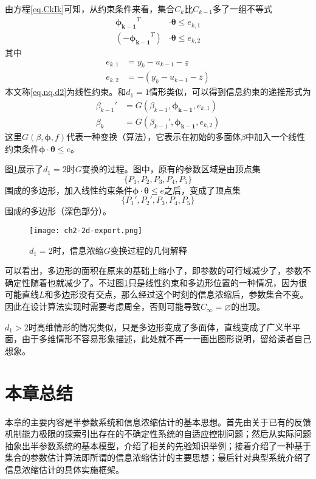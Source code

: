 由方程\eqref{eq.CkIk}可知，从约束条件来看，集合$C_{k}$比$C_{k-1}$多了一组不等式
\begin{equation}%
\label{eq.nq.d2}
\begin{split}%
\bm{\phi_{k-1}}^{T}&\cdot\bm{\theta}\leq e_{k,1}\\
(-\bm{\phi_{k-1}}^{T})&\cdot\bm{\theta}\leq e_{k,2}
\end{split}
\end{equation}
其中
\begin{equation}%
\label{eq.fk}
\begin{split}%
e_{k,1}&=y_{k}-u_{k-1}-\underline{z}\\
e_{k,2}&=-(y_{k}-u_{k-1}-\overline{z})
\end{split}
\end{equation}
本文称\eqref{eq.nq.d2}为线性约束。和$d_{1}=1$情形类似，可以得到信息约束的递推形式为
\begin{equation}%
\begin{split}%
\beta_{k-1}'&=G(\beta_{k-1},\bm{\phi_{k-1}},e_{k,1})\\
\beta_{k}&=G(\beta_{k-1}',\bm{\phi_{k-1}},e_{k,2})
\end{split}
\end{equation}
这里$G(\beta,\bm{\phi},f)$代表一种变换（算法），它表示在初始的多面体$\beta$中加入一个线性约束条件$\bm{\phi}\cdot\bm{\theta}\leq e$。

图\ref{fig.2d.export}展示了$d_{1}=2$时$G$变换的过程。图中，原有的参数区域是由顶点集
\begin{equation}%
\{P_{1},P_{2},P_{3},P_{4},P_{5}\}
\end{equation}
围成的多边形，加入线性约束条件$\bm{\phi}\cdot\bm{\theta}\leq e$之后，变成了顶点集
\begin{equation}%
\{P_{1}',P_{2}',P_{3},P_{4},P_{5}\}
\end{equation}
围成的多边形（深色部分）。

\begin{figure}[htb]
	\centering
	\texttt{[image: ch2-2d-export.png]}\\	 %
	\caption{$d_{1}=2$时，信息浓缩$G$变换过程的几何解释}
	\label{fig.2d.export}
\end{figure}

可以看出，多边形的面积在原来的基础上缩小了，即参数的可行域减少了，参数不确定性随着也就减少了。不过图\ref{fig.2d.export}只是线性约束和多边形位置的一种情况，因为很可能直线$L$和多边形没有交点，那么经过这个时刻的信息浓缩后，参数集合不变。因此在设计算法实现时需要考虑周全，否则可能导致$C_{\infty}=\varnothing$的出现。

$d_{1}>2$时高维情形的情况类似，只是多边形变成了多面体，直线变成了广义半平面，由于多维情形不容易形象描述，此处就不再一一画出图形说明，留给读者自己想象。

\section{本章总结}
本章的主要内容是半参数系统和信息浓缩估计的基本思想。首先由关于已有的反馈机制能力极限的探索引出存在的不确定性系统的自适应控制问题；然后从实际问题抽象出半参数系统的基本模型，介绍了相关的先验知识举例；接着介绍了一种基于集合的参数估计算法即所谓的信息浓缩估计的主要思想；最后针对典型系统介绍了信息浓缩估计的具体实施框架。